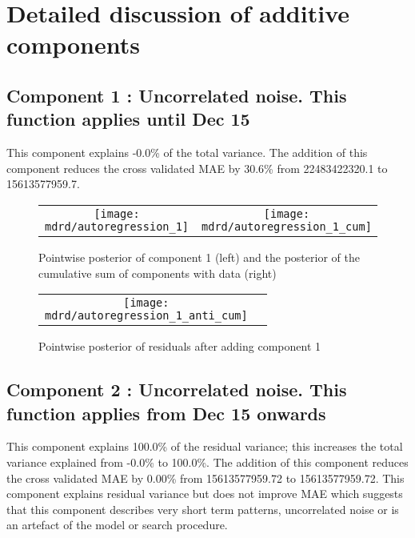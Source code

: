 \documentclass{article} %
\begin{document}
\section{Detailed discussion of additive components}
\label{sec:discussion}

\subsection{Component 1 : Uncorrelated noise. This function applies until Dec   15}



This component explains -0.0\% of the total variance.
The addition of this component reduces the cross validated MAE by 30.6\% from 22483422320.1 to 15613577959.7.


\begin{figure}[H]
\newcommand{\wmgd}{0.5\columnwidth}
\newcommand{\hmgd}{3.0cm}
\newcommand{\mdrd}{autoregression}
\newcommand{\mbm}{\hspace{-0.3cm}}
\begin{tabular}{cc}
\mbm \texttt{[image: \\mdrd/autoregression\_1]} & \texttt{[image: \\mdrd/autoregression\_1\_cum]}
\end{tabular}
\caption{Pointwise posterior of component 1 (left) and the posterior of the cumulative sum of components with data (right)}
\label{fig:comp1}
\end{figure}

\begin{figure}[H]
\newcommand{\wmgd}{0.5\columnwidth}
\newcommand{\hmgd}{3.0cm}
\newcommand{\mdrd}{autoregression}
\newcommand{\mbm}{\hspace{-0.3cm}}
\begin{tabular}{cc}
\mbm \texttt{[image: \\mdrd/autoregression\_1\_anti\_cum]}
\end{tabular}
\caption{Pointwise posterior of residuals after adding component 1}
\label{fig:comp1}
\end{figure}

\subsection{Component 2 : Uncorrelated noise. This function applies from Dec   15 onwards}



This component explains 100.0\% of the residual variance; this increases the total variance explained from -0.0\% to 100.0\%.
The addition of this component reduces the cross validated MAE by 0.00\% from 15613577959.72 to 15613577959.72.
This component explains residual variance but does not improve MAE which suggests that this component describes very short term patterns, uncorrelated noise or is an artefact of the model or search procedure.
\end{document}
